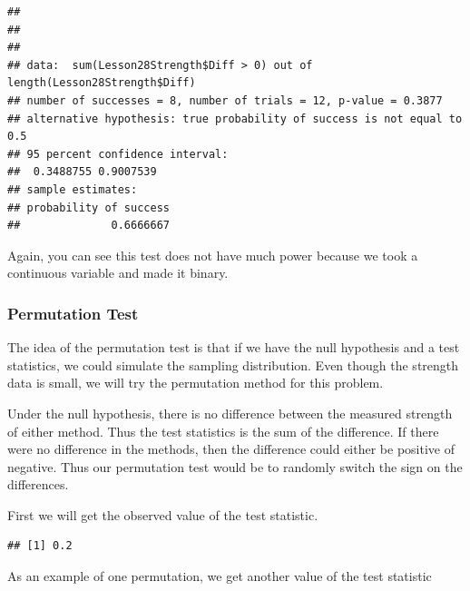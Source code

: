 \documentclass[]{book}
\newenvironment{Shaded}{\begin{snugshade}}{\end{snugshade}}
\newcommand{\KeywordTok}[1]{\textcolor[rgb]{0.13,0.29,0.53}{\textbf{#1}}}
\newcommand{\DataTypeTok}[1]{\textcolor[rgb]{0.13,0.29,0.53}{#1}}
\newcommand{\DecValTok}[1]{\textcolor[rgb]{0.00,0.00,0.81}{#1}}
\newcommand{\OtherTok}[1]{\textcolor[rgb]{0.56,0.35,0.01}{#1}}
\newcommand{\OperatorTok}[1]{\textcolor[rgb]{0.81,0.36,0.00}{\textbf{#1}}}
\newcommand{\NormalTok}[1]{#1}
\theoremstyle{definition}
\theoremstyle{definition}
\theoremstyle{definition}
\theoremstyle{remark}
\begin{document}
\begin{verbatim}
## 
## 
## 
## data:  sum(Lesson28Strength$Diff > 0) out of length(Lesson28Strength$Diff)
## number of successes = 8, number of trials = 12, p-value = 0.3877
## alternative hypothesis: true probability of success is not equal to 0.5
## 95 percent confidence interval:
##  0.3488755 0.9007539
## sample estimates:
## probability of success 
##              0.6666667
\end{verbatim}

Again, you can see this test does not have much power because we took a
continuous variable and made it binary.

\subsubsection{Permutation Test}\label{permutation-test}

The idea of the permutation test is that if we have the null hypothesis
and a test statistics, we could simulate the sampling distribution. Even
though the strength data is small, we will try the permutation method
for this problem.

Under the null hypothesis, there is no difference between the measured
strength of either method. Thus the test statistics is the sum of the
difference. If there were no difference in the methods, then the
difference could either be positive of negative. Thus our permutation
test would be to randomly switch the sign on the differences.

First we will get the observed value of the test statistic.

\begin{Shaded}
\end{Shaded}

\begin{verbatim}
## [1] 0.2
\end{verbatim}

As an example of one permutation, we get another value of the test
statistic

\begin{Shaded}
\end{Shaded}
\end{document}
